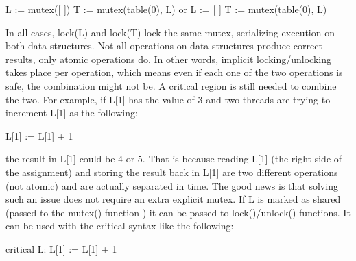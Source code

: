 \begin{iconcode}
L := mutex([ ])
T := mutex(table(0), L)
or
L := [ ]
T := mutex(table(0), L)
\end{iconcode}

In all cases, lock(L) and lock(T) lock the same mutex, serializing execution on both data structures.
Not all operations on data structures produce correct results, only atomic operations do. In other
words, implicit locking/unlocking takes place per operation, which means even if each one of the two
operations is safe, the combination might not be. A critical region is still needed to combine the two.
For example, if L[1] has the value of 3 and two threads are trying to increment L[1] as the following:

\begin{iconcode}
L[1] := L[1] + 1
\end{iconcode}

the result in L[1] could be 4 or 5. That is because reading L[1] (the right side of the assignment)
and storing the result back in L[1] are two different operations (not atomic) and are actually
separated in time. The good news is that solving such an issue does not require an extra explicit mutex.
If L is marked as shared (passed to the mutex() function ) it can be passed to lock()/unlock() functions.
It can be used with the critical syntax like the following:  

\begin{iconcode}
critical L: L[1] := L[1] + 1
\end{iconcode}


